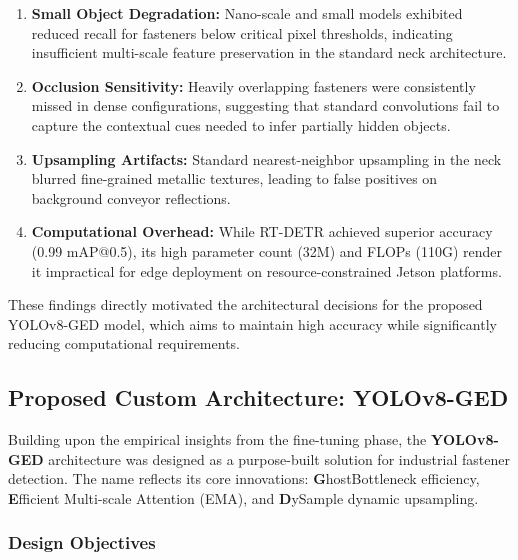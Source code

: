 \begin{enumerate}
    \item \textbf{Small Object Degradation:} Nano-scale and small models exhibited reduced recall for fasteners below critical pixel thresholds, indicating insufficient multi-scale feature preservation in the standard neck architecture.
    
    \item \textbf{Occlusion Sensitivity:} Heavily overlapping fasteners were consistently missed in dense configurations, suggesting that standard convolutions fail to capture the contextual cues needed to infer partially hidden objects.
    
    \item \textbf{Upsampling Artifacts:} Standard nearest-neighbor upsampling in the neck blurred fine-grained metallic textures, leading to false positives on background conveyor reflections.
    
    \item \textbf{Computational Overhead:} While RT-DETR achieved superior accuracy (0.99 mAP@0.5), its high parameter count (32M) and FLOPs (110G) render it impractical for edge deployment on resource-constrained Jetson platforms.
\end{enumerate}

These findings directly motivated the architectural decisions for the proposed YOLOv8-GED model, which aims to maintain high accuracy while significantly reducing computational requirements.

\subsection{Proposed Custom Architecture: YOLOv8-GED}
\label{subsec:proposed_arch}

Building upon the empirical insights from the fine-tuning phase, the \textbf{YOLOv8-GED} architecture was designed as a purpose-built solution for industrial fastener detection. The name reflects its core innovations: \textbf{G}hostBottleneck efficiency, \textbf{E}fficient Multi-scale Attention (EMA), and \textbf{D}ySample dynamic upsampling.

\subsubsection{Design Objectives}

